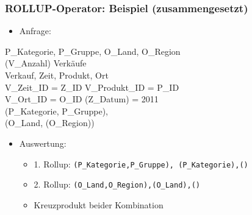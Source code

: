     \begin{frame}
    
    \frametitle{ROLLUP-Operator: Beispiel (zusammengesetzt)}
    
    
    \begin{itemize}
    \item Anfrage:
    \end{itemize}
    \begin{sql}
      P\_Kategorie, P\_Gruppe, O\_Land, O\_Region\\
    \1 (V\_Anzahl)  Verkäufe \\
      Verkauf, Zeit, Produkt, Ort \\
      V\_Zeit\_ID = Z\_ID  V\_Produkt\_ID = P\_ID \\
    \1   V\_Ort\_ID = O\_ID  (Z\_Datum) = 2011 \\
    (P\_Kategorie, P\_Gruppe), \\
    \1 (O\_Land, (O\_Region))
    \end{sql}
    
    \vspace*{-1em}
    \begin{itemize}
    \item Auswertung:
      \begin{itemize}
      \item 1. Rollup: \texttt{(P\_Kategorie,P\_Gruppe),
          (P\_Kategorie),()}
      \item 2. Rollup: \texttt{(O\_Land,O\_Region),(O\_Land),()}
      \item Kreuzprodukt beider Kombination
      \end{itemize}
    \end{itemize}
    
    \end{frame}
    
    
    
    
